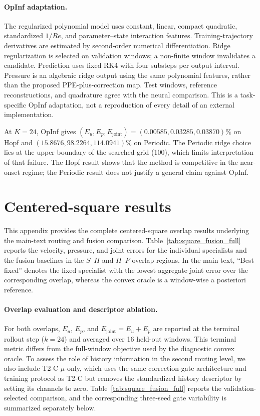 \documentclass{article}
\begin{document}
\paragraph{OpInf adaptation.}
The regularized polynomial model uses constant, linear, compact quadratic,
standardized $1/Re$, and parameter--state interaction features.
Training-trajectory derivatives are estimated by second-order numerical
differentiation. Ridge regularization is selected on validation windows;
a non-finite window invalidates a candidate. Prediction uses fixed RK4
with four substeps per output interval. Pressure is an algebraic ridge
output using the same polynomial features, rather than the proposed
PPE-plus-correction map. Test windows, reference reconstructions, and
quadrature agree with the neural comparison. This is a task-specific
OpInf adaptation, not a reproduction of every detail of an external
implementation.

At $K=24$, OpInf gives $(E_u,E_p,E_{\mathrm{joint}})=
(0.00585,0.03285,0.03870)\%$ on Hopf and
$(15.8676,98.2264,114.0941)\%$ on Periodic.
The Periodic ridge choice lies at the upper boundary of the searched
grid (100), which limits interpretation of that failure. The Hopf result
shows that the method is competitive in the near-onset regime; the
Periodic result does not justify a general claim against OpInf.

\FloatBarrier

\section{Centered-square results}
\label{app:square}


This appendix provides the complete centered-square overlap results
underlying the main-text routing and fusion comparison. Table~\ref{tab:square_fusion_full} reports the velocity, pressure,
and joint errors for the individual specialists and the fusion baselines in the $S$--$H$ and $H$--$P$ overlap regions. In the main text, ``Best fixed'' denotes the fixed specialist with the
lowest aggregate joint error over the corresponding overlap, whereas the convex oracle is a window-wise a posteriori reference.



\paragraph{Overlap evaluation and descriptor ablation.}
For both overlaps, $E_u$, $E_p$, and $E_{\mathrm{joint}}=E_u+E_p$ are reported at the terminal rollout step ($k=24$) and averaged over 16 held-out windows.  This terminal metric differs from the full-window objective used by the diagnostic convex oracle. To assess the role of history information in the second routing level, we also include T2-C $\mu$-only, which uses the same correction-gate architecture and training protocol as T2-C but removes the standardized history descriptor by setting its channels to zero. Table~\ref{tab:square_fusion_full} reports the validation-selected comparison, and the corresponding three-seed gate variability is summarized separately below.
\end{document}
